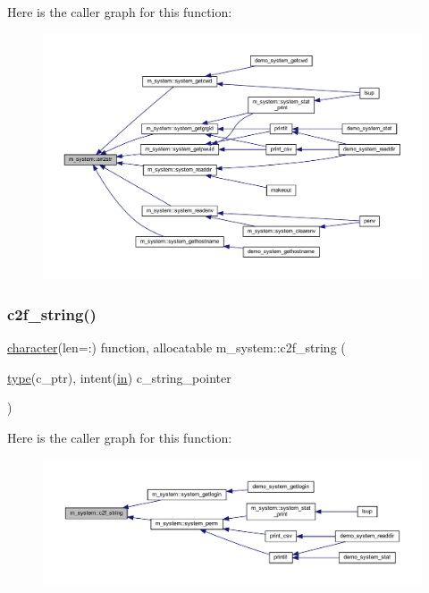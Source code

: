 Here is the caller graph for this function\+:
\nopagebreak
\begin{figure}[H]
\begin{center}
\leavevmode
\includegraphics[width=350pt]{namespacem__system_aeb3d7d4cb39d59917910a3ae2532206d_icgraph}
\end{center}
\end{figure}
\mbox{\label{namespacem__system_aa7c5445619aa15cd2301fe17f7c3b73c}} 
\subsubsection{\texorpdfstring{c2f\+\_\+string()}{c2f\_string()}}
{\footnotesize\ttfamily \hyperlink{option__stopwatch_83_8txt_abd4b21fbbd175834027b5224bfe97e66}{character}(len=\+:) function, allocatable m\+\_\+system\+::c2f\+\_\+string (\begin{DoxyParamCaption}\item[{\hyperlink{stop__watch_83_8txt_a70f0ead91c32e25323c03265aa302c1c}{type}(c\+\_\+ptr), intent(\hyperlink{M__journal_83_8txt_afce72651d1eed785a2132bee863b2f38}{in})}]{c\+\_\+string\+\_\+pointer }\end{DoxyParamCaption})\hspace{0.3cm}{\ttfamily [private]}}

Here is the caller graph for this function\+:
\nopagebreak
\begin{figure}[H]
\begin{center}
\leavevmode
\includegraphics[width=350pt]{namespacem__system_aa7c5445619aa15cd2301fe17f7c3b73c_icgraph}
\end{center}
\end{figure}
\mbox{\label{namespacem__system_a79656f76ad75168302e0d770052e901e}} 
